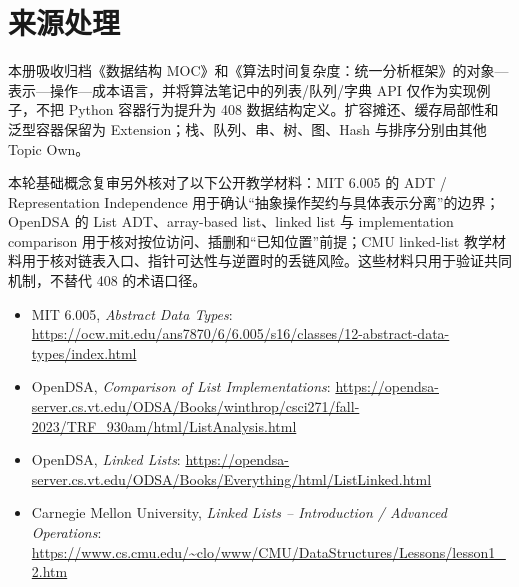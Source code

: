 \documentclass[UTF8,fontset=none,11pt,a4paper]{ctexart}
\begin{document}
\section{来源处理}
本册吸收归档《数据结构 MOC》和《算法时间复杂度：统一分析框架》的对象—表示—操作—成本语言，并将算法笔记中的列表/队列/字典 API 仅作为实现例子，不把 Python 容器行为提升为 408 数据结构定义。扩容摊还、缓存局部性和泛型容器保留为 Extension；栈、队列、串、树、图、Hash 与排序分别由其他 Topic Own。

本轮基础概念复审另外核对了以下公开教学材料：MIT 6.005 的 ADT / Representation Independence 用于确认“抽象操作契约与具体表示分离”的边界；OpenDSA 的 List ADT、array-based list、linked list 与 implementation comparison 用于核对按位访问、插删和“已知位置”前提；CMU linked-list 教学材料用于核对链表入口、指针可达性与逆置时的丢链风险。这些材料只用于验证共同机制，不替代 408 的术语口径。
\begin{itemize}
  \item MIT 6.005, \emph{Abstract Data Types}: \url{https://ocw.mit.edu/ans7870/6/6.005/s16/classes/12-abstract-data-types/index.html}
  \item OpenDSA, \emph{Comparison of List Implementations}: \url{https://opendsa-server.cs.vt.edu/ODSA/Books/winthrop/csci271/fall-2023/TRF_930am/html/ListAnalysis.html}
  \item OpenDSA, \emph{Linked Lists}: \url{https://opendsa-server.cs.vt.edu/ODSA/Books/Everything/html/ListLinked.html}
  \item Carnegie Mellon University, \emph{Linked Lists -- Introduction / Advanced Operations}: \url{https://www.cs.cmu.edu/~clo/www/CMU/DataStructures/Lessons/lesson1_2.htm}
\end{itemize}
\end{document}
